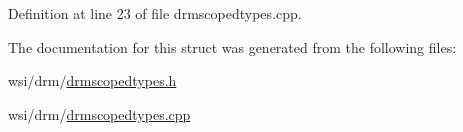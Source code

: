 Definition at line 23 of file drmscopedtypes.\+cpp.


\begin{DoxyCode}{0}
\end{DoxyCode}


The documentation for this struct was generated from the following files\+:\begin{DoxyCompactItemize}
\item 
wsi/drm/\mbox{\hyperlink{drmscopedtypes_8h}{drmscopedtypes.\+h}}\item 
wsi/drm/\mbox{\hyperlink{drmscopedtypes_8cpp}{drmscopedtypes.\+cpp}}\end{DoxyCompactItemize}
